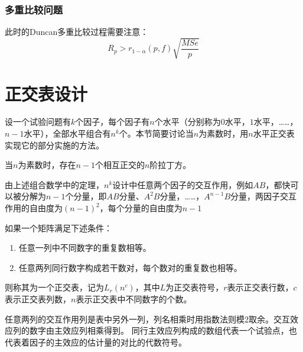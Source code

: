 \subsubsection{多重比较问题}
此时的Duncan多重比较过程需要注意：
\begin{equation*}
	R_p>r_{1-\alpha}(p,f)\sqrt{\frac{MSe}{p}}
\end{equation*}

\section{正交表设计}
设一个试验问题有$k$个因子，每个因子有$n$个水平（分别称为$0$水平，$1$水平，……，$n-1$水平），全部水平组合有$n^k$个。本节简要讨论当$n$为素数时，用$n$水平正交表实现它的部分实施的方法。
\begin{theorem}
	当$n$为素数时，存在$n-1$个相互正交的$n$阶拉丁方。
\end{theorem}
由上述组合数学中的定理，$n^k$设计中任意两个因子的交互作用，例如$AB$，都快可以被分解为$n-1$个分量，即$AB$分量、$A^2B$分量，……，$A^{n-1}B$分量，两因子交互作用的自由度为$(n-1)^2$，每个分量的自由度为$n-1$
\begin{definition}
	如果一个矩阵满足下述条件：
	\begin{enumerate}
		\item 任意一列中不同数字的重复数相等。
		\item 任意两列同行数字构成若干数对，每个数对的重复数也相等。
	\end{enumerate}
	则称其为一个正交表，记为$L_r(n^c)$，其中$L$为正交表符号，$r$表示正交表行数，$c$表示正交表列数，$n$表示正交表中不同数字的个数。
\end{definition}
任意两列的交互作用列是表中另外一列，列名相乘时用指数法则模2取余。交互效应列的数字由主效应列相乘得到。
同行主效应列构成的数组代表一个试验点，也代表着因子的主效应的估计量的对比的代数符号。
